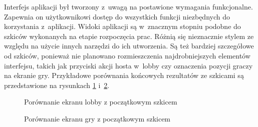 Interfejs aplikacji był tworzony z~uwagą na postawione wymagania funkcjonalne.
Zapewnia on użytkownikowi dostęp do wszystkich funkcji niezbędnych do korzystania
z~aplikacji. Widoki aplikacji są w~znacznym stopniu podobne do szkiców wykonanych na etapie
rozpoczęcia prac. Różnią się nieznacznie stylem ze względu na użycie innych narzędzi
do ich utworzenia. Są też bardziej szczegółowe od szkiców, ponieważ nie planowano
rozmieszczenia najdrobniejszych elementów interfejsu, takich jak przyciski akcji hosta
w~lobby czy oznaczenia pozycji graczy na ekranie gry. Przykładowe porównania końcowych
rezultatów ze szkicami są przedstawione na rysunkach \ref{fig:compare_lobby}
i~\ref{fig:compare_game}.

\begin{figure}[h!]
  \centering
  \hspace*{0.5cm}
  \caption{Porównanie ekranu lobby z początkowym szkicem}
  \label{fig:compare_lobby}
\end{figure}

\begin{figure}[h!]
  \centering
  \hspace*{0.5cm}
  \caption{Porównanie ekranu gry z początkowym szkicem}
  \label{fig:compare_game}
\end{figure}

